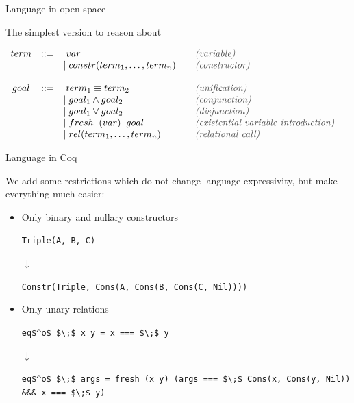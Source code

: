 \documentclass{beamer}
\let\\\tabularnewline
\let\\\tabularnewline
\theoremstyle{definition}
\theoremstyle{plain} %
\begin{document}
\begin{frame}{Language in open space}

The simplest version to reason about

\vskip8mm

$ \begin{array}{ccll}
  term & ::= & \phantom{\mid} var & \quad \textit{\textcolor{darkgray}{(variable)}} \\
           &       & \mid constr (term_1, \dots, term_n) & \quad \textit{\textcolor{darkgray}{(constructor)}} \\ \\
  goal  & ::= & \phantom{\mid} term_1 \equiv term_2 & \quad \textit{\textcolor{darkgray}{(unification)}} \\
           &       & \mid goal_1 \land goal_2 & \quad \textit{\textcolor{darkgray}{(conjunction)}} \\
           &       & \mid goal_1 \lor goal_2 & \quad \textit{\textcolor{darkgray}{(disjunction)}} \\
           &       & \mid fresh \;\; (var) \;\; goal & \quad \textit{\textcolor{darkgray}{(existential variable introduction)}} \\
           &       & \mid rel (term_1, \dots, term_n) & \quad \textit{\textcolor{darkgray}{(relational call)}} \\
\end{array} $

\end{frame}


\begin{frame}{Language in Coq}

We add some restrictions which do not change language expressivity, but make everything much easier:
\vskip5mm
\begin{itemize}
\item Only binary and nullary constructors

\begin{center}
\lstinline|Triple(A, B, C)|

$\downarrow$

\lstinline|Constr(Triple, Cons(A, Cons(B, Cons(C, Nil))))|
\end{center}

\vskip3mm
\item Only unary relations

\begin{center}
\lstinline|eq$^o$ $\;$ x y = x === $\;$ y|

$\downarrow$

\lstinline|eq$^o$ $\;$ args = fresh (x y) (args === $\;$ Cons(x, Cons(y, Nil)) &&& x === $\;$ y)|
\end{center}

\end{itemize}

\end{frame}
\end{document}
